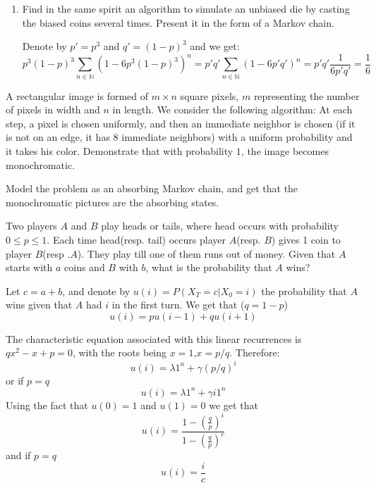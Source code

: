 \documentclass[a4paper,11pt]{exam}
\newcommand{\N}{\mathbb{N}}
\begin{document}
\begin{questions}
\begin{enumerate}
\begin{solution}
		
	\end{solution}
	
	\item Find in the same spirit an algorithm to simulate an unbiased die by casting the biased coins several times. Present it in the form of a Markov chain.
	
	\begin{solution}
		Denote by $p'=p^3$ and $q'=(1-p)^3$ and we get:
		\[
			p^3(1-p)^3\sum_{n\in\N}(1-6p^3(1-p)^3)^n=p'q'\sum_{n\in\N}(1-6p'q')^n=p'q'\frac{1}{6p'q'}=\frac{1}{6}
		\]
	\end{solution}
	
\end{enumerate}

\question

A rectangular image is formed of $ m \times n $ square pixels, $ m $ representing the number of pixels in
width and $ n $ in length.
We consider the following algorithm:
At each step, a pixel is chosen uniformly, and then an immediate neighbor is chosen
(if it is not on an edge, it has $ 8 $ immediate neighbors) with a uniform probability
and it takes his color.
Demonstrate that with probability $ 1 $, the image becomes monochromatic.

\begin{solution}
	Model the problem as an absorbing Markov chain, and get that the monochromatic pictures are the absorbing states. 
\end{solution}

\question
Two players $A$ and $B$ play heads or tails, where head occurs with probability $0\leq p\leq1$. Each time head(resp. tail) occurs player $A$(resp. $B$) gives 1 coin to player $B$(resp .$A$). They play till one of them runs out of money. Given that $A$ starts with $a$ coins and $B$ with $b$, what is the probability that $A$ wins?

\begin{solution}
	Let $c=a+b$, and denote by $u(i)=P(X_T=c|X_0=i)$ the probability that $A$ wins given that $A$ had $i$ in the first turn. We get that ($q=1-p$)
	\[
		u(i) = pu(i-1)+qu(i+1)
	\]
	
	The characteristic equation associated with this linear recurrences is $qx^2-x+p=0$, with the roots being $x=1$,$x=p/q$. Therefore:
	\[
		u(i) = \lambda1^n + \gamma(p/q)^i
	\]
	or if $p=q$
	\[
		u(i) = \lambda1^n + \gamma i1^n
	\]
	Using the fact that $ u(0)=1 $ and $ u(1)=0 $ we get that 
	\[
		u(i) = \frac{1-(\frac{q}{p})^i}{1-(\frac{q}{p})^c}
	\]
	and if $ p=q $
	\[
		u(i) = \frac{i}{c}
	\]
\end{solution}





\end{questions}
\end{document}
